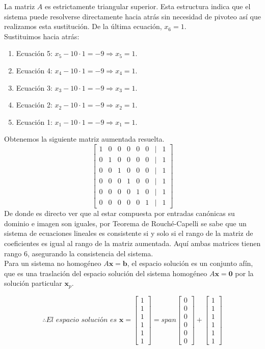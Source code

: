 \begin{solution}
La matriz \( A \) es estrictamente triangular superior. Esta estructura indica que el sistema puede resolverse directamente hacia atrás sin necesidad de pivoteo así que realizamos esta sustitución. De la última ecuación, $x_6=1$. \\

Sustituimos hacia atrás:

\begin{enumerate}
    \item Ecuación 5: $x_5-10 \cdot 1=−9 \Rightarrow x_5=1$.
    \item Ecuación 4: $x_4-10 \cdot 1=−9 \Rightarrow x_4=1$.
    \item Ecuación 3: $x_3-10 \cdot 1=−9 \Rightarrow x_3=1$.
    \item Ecuación 2: $x_2-10 \cdot 1=−9 \Rightarrow x_2=1$.
    \item Ecuación 1: $x_1-10 \cdot 1=−9 \Rightarrow x_1=1$.
\end{enumerate}

Obtenemos la siguiente matriz aumentada resuelta.
\[
\begin{bmatrix}
1 & 0 & 0 & 0 & 0 & 0 & \mid & 1 \\
0 & 1 & 0 & 0 & 0 & 0 & \mid & 1 \\
0 & 0 & 1 & 0 & 0 & 0 & \mid & 1 \\
0 & 0 & 0 & 1 & 0 & 0 & \mid & 1 \\
0 & 0 & 0 & 0 & 1 & 0 & \mid & 1 \\
0 & 0 & 0 & 0 & 0 & 1 & \mid & 1
\end{bmatrix}
\]
De donde es directo ver que al estar compuesta por entradas canónicas su dominio e imagen son iguales, por Teorema de Rouché-Capelli se sabe que un sistema de ecuaciones lineales es consistente si y solo si el rango de la matriz de coeficientes es igual al rango de la matriz aumentada. Aquí ambas matrices tienen rango 6, asegurando la consistencia del sistema.\\
Para un sistema no homogéneo \(A \mathbf{x} = \mathbf{b}\), el espacio solución es un conjunto afín, que es una traslación del espacio solución del sistema homogéneo \(A \mathbf{x} = \mathbf{0}\) por la solución particular \(\mathbf{x}_p\).


\[ \therefore \textit{El espacio solución es  }
\mathbf{x} = \begin{bmatrix}
1 \\
1 \\
1 \\
1 \\
1 \\
1
\end{bmatrix} = span \begin{bmatrix}
0 \\
0 \\
0 \\
0 \\
0 \\
0
\end{bmatrix} + \begin{bmatrix}
1 \\
1 \\
1 \\
1 \\
1 \\
1
\end{bmatrix} 
\]
\end{solution}